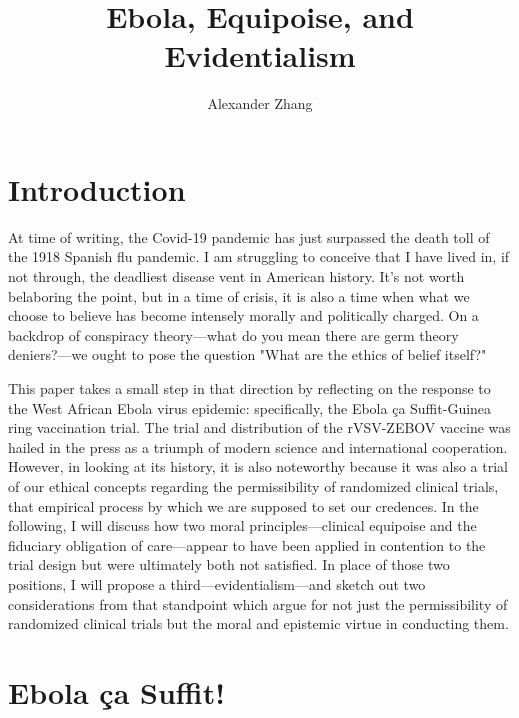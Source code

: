 \documentclass[letterpaper,notitlepage,12pt]{article}
\title{Ebola, Equipoise, and Evidentialism}
\author{Alexander Zhang}
\begin{document}
\maketitle



\section{Introduction}

At time of writing, the Covid-19 pandemic has just surpassed the death toll of
the 1918 Spanish flu pandemic.
I am struggling to conceive that I have lived in, if not through, the deadliest
disease vent in American history.
It's not worth belaboring the point, but in a time of crisis, it is also a time
when what we choose to believe has become intensely morally and politically
charged.
On a backdrop of conspiracy theory---what do you mean there are germ theory
deniers?---we ought to pose the question "What are the ethics of belief itself?"

This paper takes a small step in that direction by reflecting on the response to
the West African Ebola virus epidemic: specifically, the Ebola \c{c}a
Suffit-Guinea ring vaccination trial.
The trial and distribution of the rVSV-ZEBOV vaccine was hailed in the press as
a triumph of modern science and international cooperation.
However, in looking at its history, it is also noteworthy because it was also a
trial of our ethical concepts regarding the permissibility of randomized
clinical trials, that empirical process by which we are supposed to set our
credences.
In the following, I will discuss how two moral principles---clinical equipoise
and the fiduciary obligation of care---appear to have been applied in contention
to the trial design but were ultimately both not satisfied.
In place of those two positions, I will propose a third---evidentialism---and
sketch out two considerations from that standpoint which argue for not just the
permissibility of randomized clinical trials but the moral and epistemic virtue
in conducting them.

\section{Ebola \c{c}a Suffit!}
\end{document}
